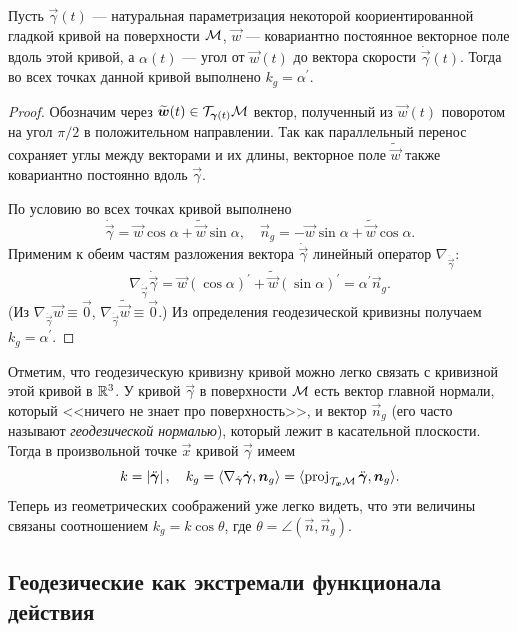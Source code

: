 \begin{proposition} \label{proposition:AngleGeodesic}
	Пусть $\vec{\gamma}(t)$ --- натуральная параметризация некоторой коориентированной гладкой кривой на поверхности $\mathcal{M}$, $\vec{w}$ --- ковариантно постоянное векторное поле вдоль этой кривой, а $\alpha(t)$ --- угол от $\vec{w}(t)$ до вектора скорости $\dot{\vec{\gamma}}(t)$. Тогда во всех точках данной кривой выполнено $k_g = \alpha^\prime$.
\end{proposition}

\begin{proof}
	Обозначим через $\widetilde{\boldsymbol{w}}(t) \in \mathcal{T}_{\boldsymbol{\gamma}(t)}\mathcal{M}$ вектор, полученный из $\vec{w}(t)$ поворотом на угол $\pi / 2$ в положительном направлении. Так как параллельный перенос сохраняет углы между векторами и их длины, векторное поле $\widetilde{\vec{w}}$ также ковариантно постоянно вдоль $\vec{\gamma}$.

	По условию во всех точках кривой выполнено
	\[
		\dot{\vec{\gamma}} = \vec{w}\cos\alpha + \widetilde{\vec{w}}\sin\alpha,\quad
		\vec{n}_g = -\vec{w}\sin\alpha + \widetilde{\vec{w}}\cos\alpha.
	\]
	Применим к обеим частям разложения вектора $\dot{\vec{\gamma}}$ линейный оператор $\nabla_{\dot{\vec{\gamma}}}$:
	\[
		\nabla_{\dot{\vec{\gamma}}}\dot{\vec{\gamma}} = \vec{w}(\cos\alpha)^\prime + \widetilde{\vec{w}}(\sin\alpha)^\prime = \alpha^\prime\vec{n}_g.
	\]
	(Из $\nabla_{\dot{\vec{\gamma}}}\vec{w} \equiv \vec{0}$, $\nabla_{\dot{\vec{\gamma}}}\widetilde{\vec{w}} \equiv \vec{0}$.) Из определения геодезической кривизны получаем $k_g = \alpha^\prime$.
\end{proof}

Отметим, что геодезическую кривизну кривой можно легко связать с кривизной этой кривой в $\mathbb{R}^3$. У кривой $\vec{\gamma}$ в поверхности $\mathcal{M}$ есть вектор главной нормали, который <<ничего не знает про поверхность>>, и вектор $\vec{n}_g$ (его часто называют \textit{геодезической нормалью}), который лежит в касательной плоскости. Тогда в произвольной точке $\vec{x}$ кривой $\vec{\gamma}$ имеем
\[ %
	k = \abs{\ddot{\vec{\gamma}}},\quad k_g = \langle\nabla_{\dot{\vec{\gamma}}}\dot{\vec{\gamma}}, \vec{n}_g\rangle = \langle\proj_{\T_{\vec{x}}\M}\ddot{\vec{\gamma}}, \vec{n}_g\rangle.
\]
Теперь из геометрических соображений уже легко видеть, что эти величины связаны соотношением $k_g = k\cos\theta$, где $\theta = \angle(\vec{n}, \vec{n}_g)$.

\subsection{Геодезические как экстремали функционала действия}

